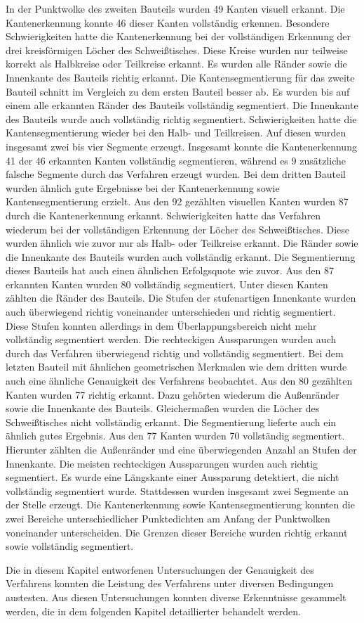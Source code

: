 In der Punktwolke des zweiten Bauteils wurden 49 Kanten visuell erkannt. Die Kantenerkennung konnte 46 dieser Kanten vollständig erkennen. Besondere Schwierigkeiten hatte die Kantenerkennung bei der vollständigen Erkennung der drei kreisförmigen Löcher des Schweißtisches. Diese Kreise wurden nur teilweise korrekt als Halbkreise oder Teilkreise erkannt. Es wurden alle Ränder sowie die Innenkante des Bauteils richtig erkannt. Die Kantensegmentierung für das zweite Bauteil schnitt im Vergleich zu dem ersten Bauteil besser ab. Es wurden bis auf einem alle erkannten Ränder des Bauteils vollständig segmentiert. Die Innenkante des Bauteils wurde auch vollständig richtig segmentiert. Schwierigkeiten hatte die Kantensegmentierung wieder bei den Halb- und Teilkreisen. Auf diesen wurden insgesamt zwei bis vier Segmente erzeugt. Insgesamt konnte die Kantenerkennung 41 der 46 erkannten Kanten vollständig segmentieren, während es 9 zusätzliche falsche Segmente durch das Verfahren erzeugt wurden. Bei dem dritten Bauteil wurden ähnlich gute Ergebnisse bei der Kantenerkennung sowie Kantensegmentierung erzielt. Aus den 92 gezählten visuellen Kanten wurden 87 durch die Kantenerkennung erkannt. Schwierigkeiten hatte das Verfahren wiederum bei der vollständigen Erkennung der Löcher des Schweißtisches. Diese wurden ähnlich wie zuvor nur als Halb- oder Teilkreise erkannt. Die Ränder sowie die Innenkante des Bauteils wurden auch vollständig erkannt. Die Segmentierung dieses Bauteils hat auch einen ähnlichen Erfolgsquote wie zuvor. Aus den 87 erkannten Kanten wurden 80 vollständig segmentiert. Unter diesen Kanten zählten die Ränder des Bauteils. Die Stufen der stufenartigen Innenkante wurden auch überwiegend richtig voneinander unterschieden und richtig segmentiert. Diese Stufen konnten allerdings in dem Überlappungsbereich nicht mehr vollständig segmentiert werden. Die rechteckigen Aussparungen wurden auch durch das Verfahren überwiegend richtig und vollständig segmentiert. Bei dem letzten Bauteil mit ähnlichen geometrischen Merkmalen wie dem dritten wurde auch eine ähnliche Genauigkeit des Verfahrens beobachtet. Aus den 80 gezählten Kanten wurden 77 richtig erkannt. Dazu gehörten wiederum die Außenränder sowie die Innenkante des Bauteils. Gleichermaßen wurden die Löcher des Schweißtisches nicht vollständig erkannt. Die Segmentierung lieferte auch ein ähnlich gutes Ergebnis. Aus den 77 Kanten wurden 70 vollständig segmentiert. Hierunter zählten die Außenränder und eine überwiegenden Anzahl an Stufen der Innenkante. Die meisten rechteckigen Aussparungen wurden auch richtig segmentiert. Es wurde eine Längskante einer Aussparung detektiert, die nicht vollständig segmentiert wurde. Stattdessen wurden insgesamt zwei Segmente an der Stelle erzeugt. Die Kantenerkennung sowie Kantensegmentierung konnten die zwei Bereiche unterschiedlicher Punktedichten am Anfang der Punktwolken voneinander unterscheiden. Die Grenzen dieser Bereiche wurden richtig erkannt sowie vollständig segmentiert.

Die in diesem Kapitel entworfenen Untersuchungen der Genauigkeit des Verfahrens konnten die Leistung des Verfahrens unter diversen Bedingungen austesten. Aus diesen Untersuchungen konnten diverse Erkenntnisse gesammelt werden, die in dem folgenden Kapitel detaillierter behandelt werden.
